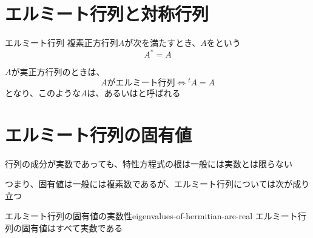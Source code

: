 \documentclass[../../../topic_linear-algebra]{subfiles}
\begin{document}
\sectionline
\section{エルミート行列と対称行列}

\begin{definition*}{エルミート行列}
  複素正方行列$A$が次を満たすとき、$A$をという
  \begin{equation*}
    A^* = A
  \end{equation*}
\end{definition*}

$A$が実正方行列のときは、
\begin{equation*}
  A\text{がエルミート行列} \Longleftrightarrow {}^tA = A
\end{equation*}
となり、このような$A$は、あるいはと呼ばれる

\sectionline
\section{エルミート行列の固有値}

行列の成分が実数であっても、特性方程式の根は一般には実数とは限らない

つまり、固有値は一般には複素数であるが、エルミート行列については次が成り立つ

\begin{theorem}{エルミート行列の固有値の実数性}{eigenvalues-of-hermitian-are-real}
  エルミート行列の固有値はすべて実数である
\end{theorem}
\end{document}
